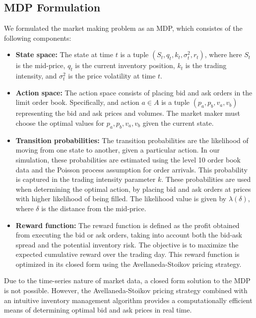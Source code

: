 \documentclass[letterpaper, 10 pt, conference]{ieeeconf}  %
\begin{document}
\subsection{MDP Formulation}
We formulated the market making problem as an MDP, which consistes of the following components:
\begin{itemize}
        \item \textbf{State space:} The state at time $t$ is a tuple $(S_t, q_t, k_t, \sigma^2_t, r_t)$, where here $S_t$ is the mid-price, $q_t$ is the current inventory position, $k_t$ is the trading intensity, and $\sigma^2_t$ is the price volatility at time $t$. 
        \item \textbf{Action space:} The action space consists of placing bid and ask orders in the limit order book. Specifically, and action $a\in A$ is a tuple $(p_a, p_b, v_a, v_b)$ representing the bid and ask prices and volumes. The market maker must choose the optimal values for $p_a, p_b, v_a, v_b$ given the current state.
        \item \textbf{Transition probabilities:} The transition probabilities are the likelihood of moving from one state to another, given a particular action. In our simulation, these probabilities are estimated using the level 10 order book data and the Poisson process assumption for order arrivals. This probability is captured in the trading intensity parameter $k$. These probabilities are used when determining the optimal action, by placing bid and ask orders at prices with higher likelihood of being filled. The likelihood value is given by $\lambda(\delta)$, where $\delta$ is the distance from the mid-price.
        \item \textbf{Reward function:} The reward function is defined as the profit obtained from executing the bid or ask orders, taking into account both the bid-ask spread and the potential inventory risk. The objective is to maximize the expected cumulative reward over the trading day. This reward function is optimized in its closed form using the Avellaneda-Stoikov pricing strategy.
\end{itemize}

Due to the time-series nature of market data, a closed form solution to the MDP is not possible. However, the Avellaneda-Stoikov pricing strategy combined with an intuitive inventory management algorithm provides a computationally efficient means of determining optimal bid and ask prices in real time.
\end{document}
